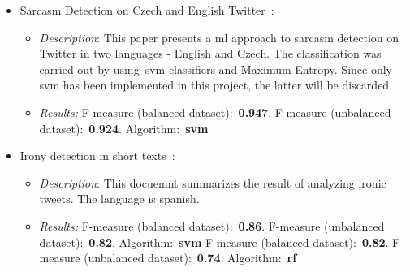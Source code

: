 \begin{itemize}
    \item Sarcasm Detection on Czech and English Twitter~\cite{ptavcek2014sarcasm}:
    \begin{itemize}
        \item \textit{Description}: This paper presents a \ac{ml} approach to sarcasm detection on Twitter in two languages - English and Czech. The classification was carried out by using~\ac{svm} classifiers and Maximum Entropy. Since only \ac{svm} has been implemented in this project, the latter will be discarded.
        \item \textit{Results:} F-measure (balanced dataset):~\textbf{0.947}. F-measure (unbalanced dataset):~\textbf{0.924}. Algorithm:~\textbf{\ac{svm}}
    \end{itemize}
    \item Irony detection in short texts~\cite{mexic}:
    \begin{itemize}
        \item \textit{Description}: This docuemnt summarizes the result of analyzing ironic tweets. The language is spanish.
        \item \textit{Results:} F-measure (balanced dataset):~\textbf{0.86}. F-measure (unbalanced dataset):~\textbf{0.82}. Algorithm:~\textbf{\ac{svm}}
        F-measure (balanced dataset):~\textbf{0.82}. F-measure (unbalanced dataset):~\textbf{0.74}. Algorithm:~\textbf{\ac{rf}}
    \end{itemize}
    
\end{itemize}